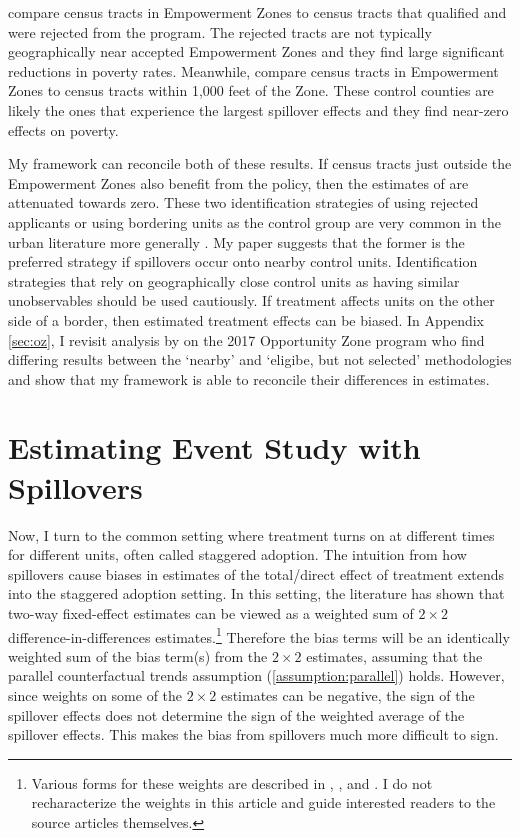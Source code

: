 \documentclass[11pt]{article}
\begin{document}
\citet{Busso_Gregory_Kline_2013} compare census tracts in Empowerment Zones to census tracts that qualified and were rejected from the program. The rejected tracts are not typically geographically near accepted Empowerment Zones and they find large significant reductions in poverty rates. Meanwhile, \citet{Neumark_Kolko_2010} compare census tracts in Empowerment Zones to census tracts within 1,000 feet of the Zone. These control counties are likely the ones that experience the largest spillover effects and they find near-zero effects on poverty. 

My framework can reconcile both of these results. If census tracts just outside the Empowerment Zones also benefit from the policy, then the estimates of \citet{Neumark_Kolko_2010} are attenuated towards zero. These two identification strategies of using rejected applicants or using bordering units as the control group are very common in the urban literature more generally \citep{Baum-Snow_Ferreira_2015}. My paper suggests that the former is the preferred strategy if spillovers occur onto nearby control units. Identification strategies that rely on geographically close control units as having similar unobservables should be used cautiously. If treatment affects units on the other side of a border, then estimated treatment effects can be biased. In Appendix \ref{sec:oz}, I revisit analysis by \citet{Chen_Glaeser_Wessel_2021} on the 2017 Opportunity Zone program who find differing results between the `nearby' and `eligibe, but not selected' methodologies and show that my framework is able to reconcile their differences in estimates.


\section{Estimating Event Study with Spillovers}
\label{sec:event_study}

Now, I turn to the common setting where treatment turns on at different times for different units, often called staggered adoption. The intuition from how spillovers cause biases in estimates of the total/direct effect of treatment extends into the staggered adoption setting. In this setting, the literature has shown that two-way fixed-effect estimates can be viewed as a weighted sum of $2 \times 2$ difference-in-differences estimates.\footnote{Various forms for these weights are described in \citet{Goodman-Bacon_2018}, \citet{Sun_Abraham_2020}, and \citet{deChaisemartin_DHaultfoeuille_2019}. I do not recharacterize the weights in this article and guide interested readers to the source articles themselves.} Therefore the bias terms will be an identically weighted sum of the bias term(s) from the $2 \times 2$ estimates, assuming that the parallel counterfactual trends assumption (\ref{assumption:parallel}) holds. However, since weights on some of the $2 \times 2$ estimates can be negative, the sign of the spillover effects does not determine the sign of the weighted average of the spillover effects. This makes the bias from spillovers much more difficult to sign. 
\end{document}
